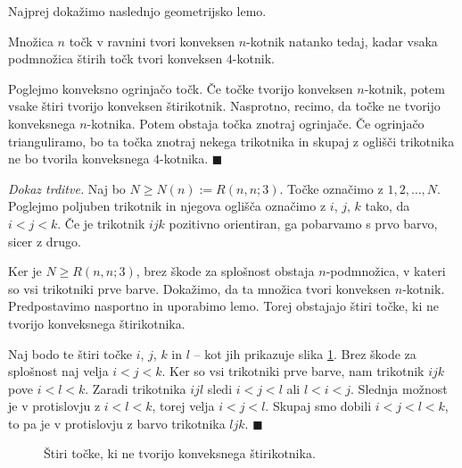 \documentclass[twoside,11pt]{article}
\begin{document}
Najprej dokažimo naslednjo geometrijsko lemo.
\begin{lema}
    Množica $n$ točk v ravnini tvori konveksen $n$-kotnik natanko tedaj, kadar
    vsaka podmnožica štirih točk tvori konveksen $4$-kotnik.
\end{lema}
\begin{dokaz}
    Poglejmo konveksno ogrinjačo točk. Če točke tvorijo konveksen $n$-kotnik, potem vsake 
    štiri tvorijo konveksen štirikotnik. Nasprotno, recimo, da točke ne tvorijo konveksnega 
    $n$-kotnika. Potem obstaja točka znotraj ogrinjače. Če ogrinjačo trianguliramo, bo ta 
    točka znotraj nekega trikotnika in skupaj z oglišči trikotnika ne bo tvorila 
    konveksnega $4$-kotnika. \hfill $\blacksquare$
\end{dokaz}

\noindent\textit{Dokaz trditve.}
    Naj bo $N \ge N(n) := R(n,n;3)$. Točke označimo z $1, 2, \dots, N$. 
    Poglejmo poljuben trikotnik in njegova oglišča označimo z $i$, $j$, $k$ tako, da $i < j < k$. Če je 
    trikotnik $ijk$ pozitivno orientiran, ga pobarvamo s prvo barvo, sicer z drugo.

    Ker je $N \ge R(n,n;3)$, brez škode za splošnost obstaja $n$-podmnožica, v kateri so 
    vsi trikotniki prve barve. Dokažimo, da ta množica tvori konveksen $n$-kotnik. Predpostavimo 
    nasportno in uporabimo lemo. Torej obstajajo štiri točke, ki ne tvorijo konveksnega 
    štirikotnika. 

    Naj bodo te štiri točke $i$, $j$, $k$ in $l$ -- kot jih prikazuje slika \ref{fig:happy}. 
    Brez škode za splošnost naj velja $i < j < k$. Ker so vsi trikotniki prve barve, nam 
    trikotnik $ijk$ pove $i < l < k$. Zaradi trikotnika  $ijl$ sledi $i < j < l$ 
    ali $l < i < j$. Slednja možnost je v protislovju z $i < l < k$, torej velja $i < j < l$. Skupaj 
    smo dobili $i < j < l < k$, to pa je v protislovju z barvo trikotnika 
    $ljk$. \hfill $\blacksquare$

    \begin{figure}[h!]
        \centering
        \caption{Štiri točke, ki ne tvorijo konveksnega štirikotnika.}
        \label{fig:happy}
    \end{figure}
\end{document}
